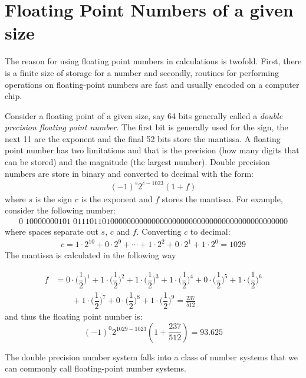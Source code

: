 \section{Floating Point Numbers of a given size}

The reason for using floating point numbers in calculations is twofold.
First, there is a finite size of storage for a number and secondly,
routines for performing operations on floating-point numbers are fast
and usually encoded on a computer chip.

Consider a floating point of a given size, say 64 bits generally called
a \emph{double precision floating point number}. The first bit is
generally used for the sign, the next 11 are the exponent and the final
52 bits store the mantissa. A floating point number has two limitations
and that is the precision (how many digits that can be stored) and the
magnitude (the largest number). Double precision numbers are store in
binary and converted to decimal with the form:
%
\begin{align*}
(-1)^{s} 2^{c-1023}(1+f)
\end{align*} 
%
where $s$ is the sign $c$ is the exponent and $f$ stores the mantissa. For example, consider the following number:
\begin{align*}
0\;10000000101\;0111011010000000000000000000000000000000000000000000
\end{align*}
%
where spaces separate out $s$, $c$ and $f$. Converting $c$ to decimal:
\begin{align*}
c = 1 \cdot 2^{10} + 0 \cdot 2^{9} + \cdots + 1 \cdot 2^{2} + 0 \cdot 2^{1} + 1 \cdot 2^{0} = 1029
\end{align*}
%
The mantissa is calculated in the following way

\begin{align*}
f & =  0 \cdot \biggl(\dfrac{1}{2}\biggr)^{1} + 1 \cdot \biggl(\dfrac{1}{2}\biggr)^{2} + 1 \cdot \biggl(\dfrac{1}{2}\biggr)^{3} + 1 \cdot \biggl(\dfrac{1}{2}\biggr)^{4} + 0 \cdot \biggl(\dfrac{1}{2}\biggr)^{5} + 1 \cdot \biggl(\dfrac{1}{2}\biggr)^{6}  \\\
& \qquad + 1 \cdot \biggl(\dfrac{1}{2}\biggr)^{7} + 0 \cdot \biggl(\dfrac{1}{2}\biggr)^{8} + 1 \cdot \biggl(\dfrac{1}{2}\biggr)^{9} = \frac{237}{512}
\end{align*}
and thus the floating point number is:
\[(-1)^{0} 2^{1029-1023} \left(1+\dfrac{237}{512}\right) = 93.625\]

The double precision number system falls into a class of number systems
that we can commonly call floating-point number systems.




